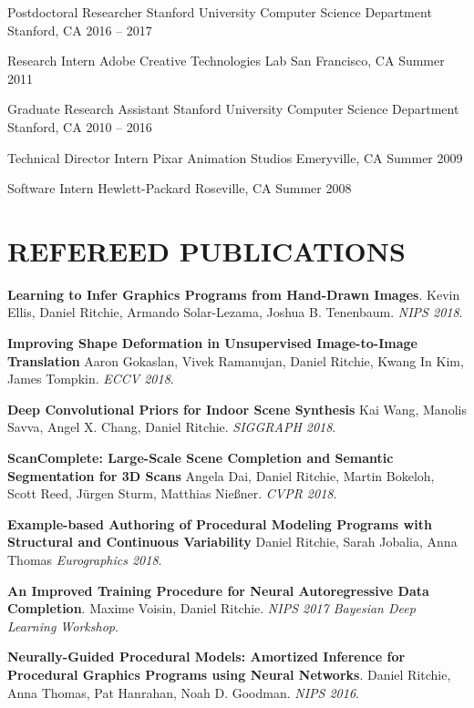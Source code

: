 \documentclass[line,margin]{res}
\begin{document}
\begin{resume}
\job
{Postdoctoral Researcher}
{Stanford University Computer Science Department}
{Stanford, CA}
{2016 -- 2017}

\job
{Research Intern}
{Adobe Creative Technologies Lab}
{San Francisco, CA}
{Summer 2011}

\job
{Graduate Research Assistant}
{Stanford University Computer Science Department}
{Stanford, CA}
{2010 -- 2016}

\job
{Technical Director Intern}
{Pixar Animation Studios}
{Emeryville, CA}
{Summer 2009}

\job
{Software Intern}
{Hewlett-Packard}
{Roseville, CA}
{Summer 2008}


\section{REFEREED PUBLICATIONS}

\newcommand{\pubtitle}[1]{\textbf{#1}}
\newcommand{\pubauthors}[1]{#1}
\newcommand{\pubvenue}[1]{\emph{#1}}
\newcommand{\pubaward}[1]{\textsc{#1}}

\pubtitle{Learning to Infer Graphics Programs from Hand-Drawn Images}. 
\pubauthors{Kevin Ellis, Daniel Ritchie, Armando Solar-Lezama, Joshua B. Tenenbaum.}
\pubvenue{NIPS 2018}.

\pubtitle{Improving Shape Deformation in Unsupervised Image-to-Image Translation}
\pubauthors{Aaron Gokaslan, Vivek Ramanujan, Daniel Ritchie, Kwang In Kim, James Tompkin.}
\pubvenue{ECCV 2018}.

\pubtitle{Deep Convolutional Priors for Indoor Scene Synthesis}
\pubauthors{Kai Wang, Manolis Savva, Angel X. Chang, Daniel Ritchie.}
\pubvenue{SIGGRAPH 2018}.

\pubtitle{ScanComplete: Large-Scale Scene Completion and Semantic Segmentation for 3D Scans}
\pubauthors{Angela Dai, Daniel Ritchie, Martin Bokeloh, Scott Reed, Jürgen Sturm, Matthias Nießner.}
\pubvenue{CVPR 2018}.

\pubtitle{Example-based Authoring of Procedural Modeling Programs with Structural and Continuous Variability}
\pubauthors{Daniel Ritchie, Sarah Jobalia, Anna Thomas}
\pubvenue{Eurographics 2018}.

\pubtitle{An Improved Training Procedure for Neural Autoregressive Data Completion}. 
\pubauthors{Maxime Voisin, Daniel Ritchie.}
\pubvenue{NIPS 2017 Bayesian Deep Learning Workshop}.

\pubtitle{Neurally-Guided Procedural Models: Amortized Inference for Procedural Graphics Programs using Neural Networks}. 
\pubauthors{Daniel Ritchie, Anna Thomas, Pat Hanrahan, Noah D. Goodman.}
\pubvenue{NIPS 2016}.


\end{resume}
\end{document}
